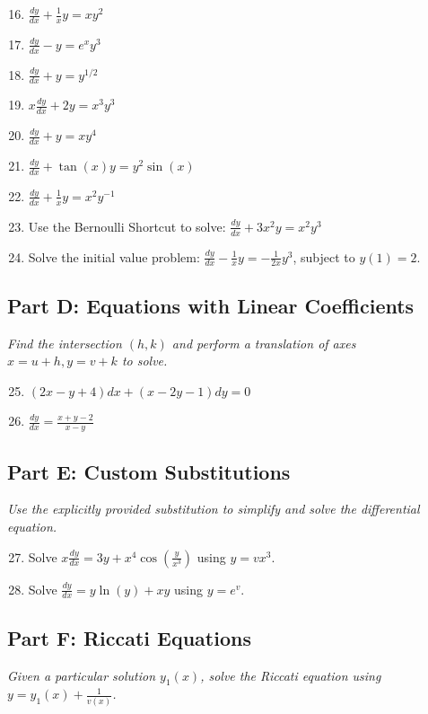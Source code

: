 \documentclass[12pt]{article}
\begin{document}
\begin{enumerate}
    \setcounter{enumi}{15}
    \item $\frac{dy}{dx} + \frac{1}{x}y = x y^2$
    \item $\frac{dy}{dx} - y = e^x y^3$
    \item $\frac{dy}{dx} + y = y^{1/2}$
    \item $x \frac{dy}{dx} + 2y = x^3 y^3$
    \item $\frac{dy}{dx} + y = x y^4$
    \item $\frac{dy}{dx} + \tan(x)y = y^2 \sin(x)$
    \item $\frac{dy}{dx} + \frac{1}{x}y = x^2 y^{-1}$
    \item Use the Bernoulli Shortcut to solve: $\frac{dy}{dx} + 3x^2 y = x^2 y^3$
    \item Solve the initial value problem: $\frac{dy}{dx} - \frac{1}{x}y = -\frac{1}{2x}y^3$, subject to $y(1) = 2$.
\end{enumerate}

\subsection*{Part D: Equations with Linear Coefficients}
\textit{Find the intersection $(h,k)$ and perform a translation of axes $x = u+h, y = v+k$ to solve.}

\begin{enumerate}
    \setcounter{enumi}{24}
    \item $(2x-y+4)dx + (x-2y-1)dy = 0$
    \item $\frac{dy}{dx} = \frac{x+y-2}{x-y}$
\end{enumerate}

\subsection*{Part E: Custom Substitutions}
\textit{Use the explicitly provided substitution to simplify and solve the differential equation.}

\begin{enumerate}
    \setcounter{enumi}{26}
    \item Solve $x \frac{dy}{dx} = 3y + x^4 \cos\left(\frac{y}{x^3}\right)$ using $y = vx^3$.
    \item Solve $\frac{dy}{dx} = y \ln(y) + x y$ using $y = e^v$.
\end{enumerate}

\subsection*{Part F: Riccati Equations}
\textit{Given a particular solution $y_1(x)$, solve the Riccati equation using $y = y_1(x) + \frac{1}{v(x)}$.}
\end{document}
